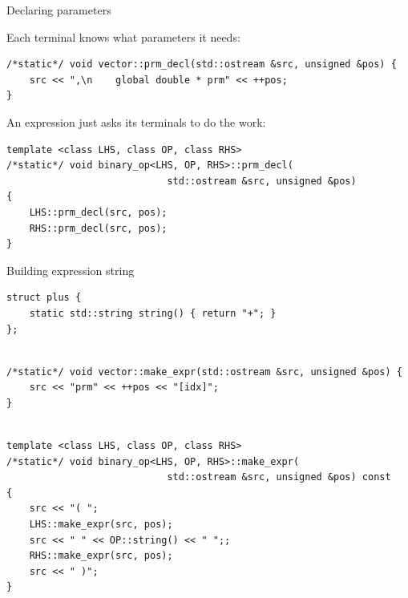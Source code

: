 \documentclass[@BEAMER_OPTIONS@]{beamer}
\begin{document}
\note{ }

\begin{frame}[fragile]{Declaring parameters}
    \begin{exampleblock}{Each terminal knows what parameters it needs:}
        \begin{lstlisting}
/*static*/ void vector::prm_decl(std::ostream &src, unsigned &pos) {
    src << ",\n    global double * prm" << ++pos;
}
        \end{lstlisting}
    \end{exampleblock}
    \begin{exampleblock}{An expression just asks its terminals to do the work:}
        \begin{lstlisting}[firstnumber=last]
template <class LHS, class OP, class RHS>
/*static*/ void binary_op<LHS, OP, RHS>::prm_decl(
                            std::ostream &src, unsigned &pos)
{
    LHS::prm_decl(src, pos);
    RHS::prm_decl(src, pos);
}
        \end{lstlisting}
    \end{exampleblock}
\end{frame}

\note{ }

\begin{frame}[fragile]{Building expression string}
    \begin{exampleblock}{}
        \begin{lstlisting}
struct plus {
    static std::string string() { return "+"; }
};
        \end{lstlisting}
        \pause
        \begin{lstlisting}[firstnumber=last]

/*static*/ void vector::make_expr(std::ostream &src, unsigned &pos) {
    src << "prm" << ++pos << "[idx]";
}
        \end{lstlisting}
        \pause
        \begin{lstlisting}[firstnumber=last]

template <class LHS, class OP, class RHS>
/*static*/ void binary_op<LHS, OP, RHS>::make_expr(
                            std::ostream &src, unsigned &pos) const
{
    src << "( ";
    LHS::make_expr(src, pos);
    src << " " << OP::string() << " ";;
    RHS::make_expr(src, pos);
    src << " )";
}
        \end{lstlisting}
    \end{exampleblock}
\end{frame}
\end{document}
